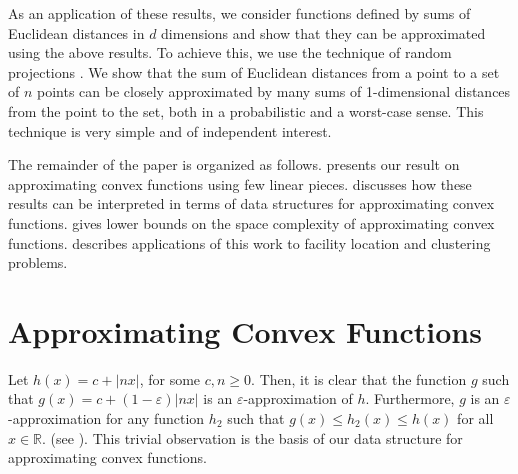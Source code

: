 \documentclass[charterfonts,lotsofwhite]{patmorin}
\newcommand{\eps}{\varepsilon}
\newcommand{\Real}{\mathbb{R}}
\begin{document}
As an application of these results, we consider functions defined by
sums of Euclidean distances in $d$ dimensions and show that they can
be approximated using the above results.  To achieve this, we use the
technique of random projections \cite{i01,k97}.  We show that the sum
of Euclidean distances from a point to a set of $n$ points can be
closely approximated by many sums of 1-dimensional distances from the
point to the set, both in a probabilistic and a worst-case sense.
This technique is very simple and of independent interest.

The remainder of the paper is organized as follows.  
presents our result on approximating convex functions using few linear
pieces.   discusses how these results can be interpreted in
terms of data structures for approximating convex functions.
 gives lower bounds on the space complexity of
approximating convex functions.   describes
applications of this work to facility location and clustering
problems.

\section{Approximating Convex Functions}

Let $h(x)=c+|nx|$, for some $c,n\ge 0$.  Then, it is clear that the
function $g$ such that $g(x)=c+(1-\eps)|nx|$ is an
$\eps$-approximation of $h$.  Furthermore, $g$ is an
$\eps$-approximation for any function $h_2$ such that $g(x)\le
h_2(x)\le h(x)$ for all $x\in\Real$. (see ).  This
trivial observation is the basis of our data structure for
approximating convex functions.
\end{document}
